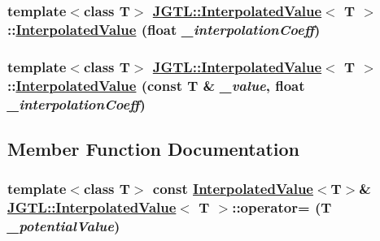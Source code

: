 \hypertarget{class_j_g_t_l_1_1_interpolated_value_9664708ef92a7c352429c37d0f463f2f}{
\subsubsection[InterpolatedValue]{\setlength{\rightskip}{0pt plus 5cm}template$<$class T$>$ \hyperlink{class_j_g_t_l_1_1_interpolated_value}{JGTL::Interpolated\-Value}$<$ T $>$::\hyperlink{class_j_g_t_l_1_1_interpolated_value}{Interpolated\-Value} (float {\em \_\-interpolation\-Coeff})}}
\label{class_j_g_t_l_1_1_interpolated_value_9664708ef92a7c352429c37d0f463f2f}


\hypertarget{class_j_g_t_l_1_1_interpolated_value_d8bccc51f6cb96e1bfe433d5b83a94ba}{
\subsubsection[InterpolatedValue]{\setlength{\rightskip}{0pt plus 5cm}template$<$class T$>$ \hyperlink{class_j_g_t_l_1_1_interpolated_value}{JGTL::Interpolated\-Value}$<$ T $>$::\hyperlink{class_j_g_t_l_1_1_interpolated_value}{Interpolated\-Value} (const T \& {\em \_\-value}, float {\em \_\-interpolation\-Coeff})}}
\label{class_j_g_t_l_1_1_interpolated_value_d8bccc51f6cb96e1bfe433d5b83a94ba}




\subsection{Member Function Documentation}
\hypertarget{class_j_g_t_l_1_1_interpolated_value_30b679bad94ef7adf003bf99e5756a53}{
\subsubsection[operator=]{\setlength{\rightskip}{0pt plus 5cm}template$<$class T$>$ const \hyperlink{class_j_g_t_l_1_1_interpolated_value}{Interpolated\-Value}$<$T$>$\& \hyperlink{class_j_g_t_l_1_1_interpolated_value}{JGTL::Interpolated\-Value}$<$ T $>$::operator= (T {\em \_\-potential\-Value})}}
\label{class_j_g_t_l_1_1_interpolated_value_30b679bad94ef7adf003bf99e5756a53}




